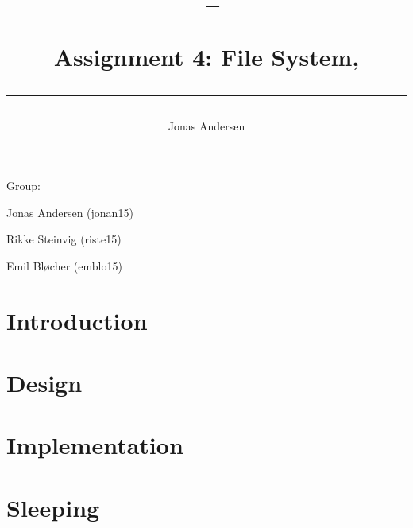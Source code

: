 \documentclass[a4paper,10pt]{article}
\author{Jonas Andersen}
\title{\begin{flushleft}
\vspace{-4ex}
\courseid~-- \coursename \\[0.2cm]
{\Large Assignment 4: File System, \term \\[3ex]
\hrule}
\end{flushleft}
}
\date{}
\begin{document}
\maketitle
Group: 

Jonas Andersen (jonan15)

Rikke Steinvig (riste15)

Emil Bløcher (emblo15)

\newpage
\tableofcontents

\newpage
\section{Introduction}


\section{Design}
\label{design}


\section{Implementation}


%




\section{Sleeping}
\end{document}
